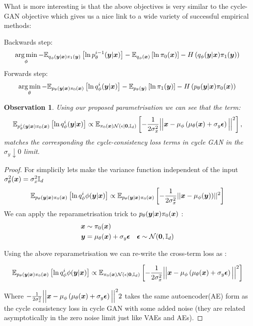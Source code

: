 \documentclass[a4paper,12pt,twoside,openright]{report}
\newtheorem{observation}[theorem]{Observation}
\theoremstyle{definition}
\begin{document}
What is more interesting is that the above objectives is very similar to the cycle-GAN \citep{zhu2017unpaired} objective which gives us a nice link to a wide variety of successful empirical methods:

Backwards step:
\begin{align*}
\operatorname*{arg\,min}_\phi- \mathbb{E}_{q_{\phi}({\bm{y}}|{\bm{x}})\pi_1({\bm{y}})}\left[  \operatorname{ln}  p^{i-1}_{\theta}({\bm{y}}|{\bm{x}})\right] -  \mathbb{E}_{q_{\phi}({\bm{x}})}\left[ \operatorname{ln}  \pi_0({\bm{x}}) \right] - H\left(q_{\phi}({\bm{y}}|{\bm{x}})\pi_1({\bm{y}})\right)
\end{align*}
Forwards step:
\begin{align*}
\operatorname*{arg\,min}_\theta- \mathbb{E}_{p_{\theta}({\bm{y}}|{\bm{x}})\pi_0({\bm{x}})}\left[  \operatorname{ln}  q^i_{\phi}({\bm{y}}|{\bm{x}})\right] -  \mathbb{E}_{p_{\theta}({\bm{y}})}\left[ \operatorname{ln}  \pi_1({\bm{y}}) \right] - H\left(p_{\theta}({\bm{y}}|{\bm{x}})\pi_0({\bm{x}})\right)
\end{align*}

\begin{observation}\label{obs:cycle}
Using our proposed parametrisation we can see that the term:
$$\mathbb{E}_{p^i_{\theta}({\bm{y}}|{\bm{x}})\pi_0({\bm{x}})}\left[  \operatorname{ln}  q^i_{\phi}({\bm{y}}|{\bm{x}})\right] \propto \mathbb{E}_{\pi_0({\bm{x}})\mathcal{N}(\epsilon|\textbf{0},{\mathbb{I}_d} )}\left[  -  \frac{1}{2\sigma_x^2}\Big|\Big|{\bm{x}}- \mu_\phi\left(\mu_\theta({\bm{x}}) + \sigma_y \bm{\epsilon}\right) \Big|\Big|^2\right],$$
matches the corresponding the cycle-consistency loss terms in cycle GAN \cite{zhu2017unpaired} in the $\sigma_y \downarrow 0$ limit.
\end{observation}
\begin{proof}
For simplicily lets make the variance function independent of the input $\sigma^2_{\theta}({\bm{x}}) = \sigma_{x}^2 {\mathbb{I}_d}$ 
\begin{align*}
\mathbb{E}_{p_{\theta}({\bm{y}}|{\bm{x}})\pi_0({\bm{x}})}\left[  \operatorname{ln}  q^i_{\phi}{\phi}({\bm{y}}|{\bm{x}})\right] \propto \mathbb{E}_{p_{\theta}({\bm{y}}|{\bm{x}})\pi_0({\bm{x}})}\left[  -  \frac{1}{2\sigma_x^2}||{\bm{x}}- {\mu}_{\phi}({\bm{y}}))||^2\right]
\end{align*}
We can apply the reparametrisation trick \cite{kingma2013auto} to $p_{\theta}({\bm{y}}|{\bm{x}})\pi_0({\bm{x}})$ : 
\begin{align*}
    {\bm{x}} &\sim \pi_0({\bm{x}}) \\
    {\bm{y}} &= {\mu}_{\theta}({\bm{x}}) + \sigma_y \bm{\epsilon} \quad \bm{\epsilon} \sim \mathcal{N}(\textbf{0}, {\mathbb{I}_d})
\end{align*}

Using the above reparametrisation we can re-write the cross-term loss as : 

\begin{align*}
 \mathbb{E}_{p_{\theta}({\bm{y}}|{\bm{x}})\pi_0({\bm{x}})}\left[  \operatorname{ln}  q^i_{\phi}{\phi}({\bm{y}}|{\bm{x}})\right] \propto \mathbb{E}_{\pi_0({\bm{x}})\mathcal{N}(\epsilon|\textbf{0},{\mathbb{I}_d} )}\left[  -  \frac{1}{2\sigma_x^2}\Big|\Big|{\bm{x}}- \mu_\phi\left(\mu_\theta({\bm{x}}) + \sigma_y \bm{\epsilon}\right) \Big|\Big|^2\right]
\end{align*}

Where $ -  \frac{1}{2\sigma_x^2}\Big|\Big|{\bm{x}}- \mu_\phi\left(\mu_\theta({\bm{x}}) + \sigma_y \bm{\epsilon}\right) \Big|\Big|^22$ takes the same autoencoder(AE) form as the cycle consistency loss in cycle GAN with some added noise (they are related asymptotically in the zero noise limit just like VAEs and AEs).
\end{proof}
\end{document}
